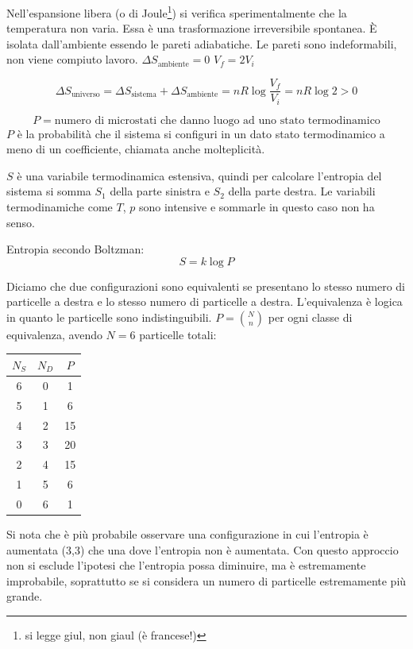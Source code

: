 Nell'espansione libera (o di Joule\footnote{si legge giul, non giaul (è francese!)}) si verifica sperimentalmente che la temperatura non varia. Essa è una trasformazione irreversibile spontanea. \`E isolata dall'ambiente essendo le pareti adiabatiche. Le pareti sono indeformabili, non viene compiuto lavoro. $\Delta S_\text{ambiente}=0$ $V_f=2V_i$

$$\Delta S_\text{universo}=\Delta S_\text{sistema}+\Delta S_\text{ambiente}=nR\log\frac{V_f}{V_i}=nR\log 2>0$$

$$P=\text{numero di microstati che danno luogo ad uno stato termodinamico}$$
$P$ è la probabilità che il sistema si configuri in un dato stato termodinamico a meno di un coefficiente, chiamata anche molteplicità.

$S$ è una variabile termodinamica estensiva, quindi per calcolare l'entropia del sistema si somma $S_1$ della parte sinistra e $S_2$ della parte destra. Le variabili termodinamiche come $T$, $p$ sono intensive e sommarle in questo caso non ha senso.
\begin{legge}
Entropia secondo Boltzman:
\begin{equation}
S=k\log P
\end{equation}
\end{legge}
Diciamo che due configurazioni sono equivalenti se presentano lo stesso numero di particelle a destra e lo stesso numero di particelle a destra. L'equivalenza è logica in quanto le particelle sono indistinguibili. $P=\binom{N}{n}$ per ogni classe di equivalenza, avendo $N=6$ particelle totali:
\begin{center}
\begin{tabular}{c|c|c}
$N_S$&$N_D$&$P$\\
\hline
6&0&1\\
5&1&6\\
4&2&15\\
3&3&20\\
2&4&15\\
1&5&6\\
0&6&1\\
\end{tabular}
\end{center}
Si nota che è più probabile osservare una configurazione in cui l'entropia è aumentata (3,3) che una dove l'entropia non è aumentata. Con questo approccio non si esclude l'ipotesi che l'entropia possa diminuire, ma è estremamente improbabile, soprattutto se si considera un numero di particelle estremamente più grande.

